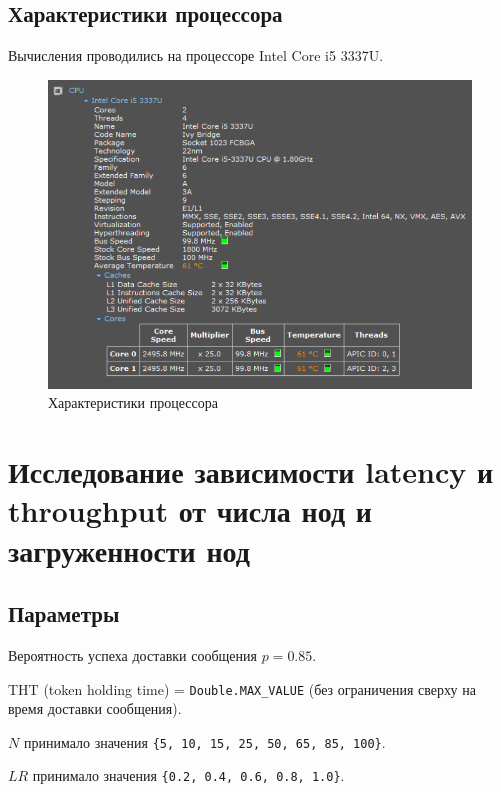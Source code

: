\documentclass[12pt]{article}
\begin{document}
\subsection{Характеристики процессора}
Вычисления проводились на процессоре Intel Core i5 3337U. 
\begin{figure}[H]
\centering
\includegraphics[width=1.0\textwidth]{Plots/intel.png}
\caption{Характеристики процессора}
\end{figure}


\section{Исследование зависимости latency и throughput от числа нод и загруженности нод}

\subsection{Параметры}
Вероятность успеха доставки сообщения $p=0.85$.

THT (token holding time) = \lstinline|Double.MAX_VALUE| (без ограничения сверху на время доставки сообщения).

$N$ принимало значения \lstinline|{5, 10, 15, 25, 50, 65, 85, 100}|. 

$LR$ принимало значения \lstinline|{0.2, 0.4, 0.6, 0.8, 1.0}|.
\end{document}
